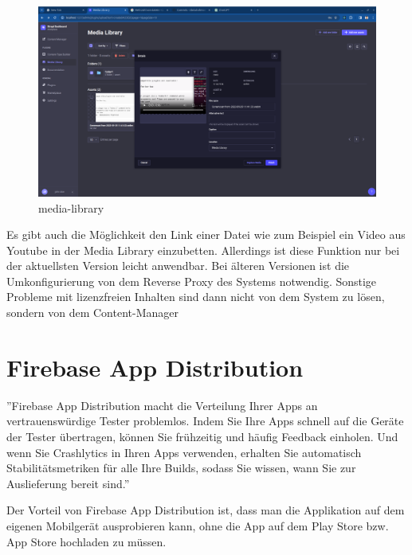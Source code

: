 \begin{figure}[H]
  \centering
  \includegraphics[width=\textwidth]{./pics/media-library.png}
  \caption{media-library}

\end{figure}

Es gibt auch die Möglichkeit den Link einer Datei wie zum Beispiel ein Video aus Youtube in der Media Library einzubetten. Allerdings ist diese Funktion nur bei der aktuellsten Version leicht anwendbar. Bei älteren Versionen ist die Umkonfigurierung von dem Reverse Proxy des Systems notwendig. Sonstige Probleme mit lizenzfreien Inhalten sind dann nicht von dem System zu lösen, sondern von dem Content-Manager
\cite{url-upload-problem}





\section{Firebase App Distribution}

''Firebase App Distribution macht die Verteilung
Ihrer Apps an vertrauenswürdige Tester problemlos. Indem Sie Ihre Apps schnell
auf die Geräte der Tester übertragen, können Sie frühzeitig und häufig
Feedback einholen.
Und wenn Sie Crashlytics in Ihren Apps verwenden, erhalten Sie automatisch Stabilitätsmetriken für alle Ihre Builds, sodass Sie wissen, wann Sie zur Auslieferung bereit sind.''\cite{fire-base-app-distribution}

Der Vorteil von Firebase App Distribution ist,
dass man die Applikation auf dem eigenen Mobilgerät ausprobieren kann,
ohne die App auf dem Play Store bzw. App Store hochladen zu müssen.